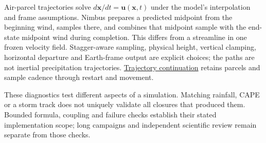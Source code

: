 Air-parcel trajectories solve $d\boldsymbol x/dt=\boldsymbol u(\boldsymbol x,t)$
under the model's interpolation and frame assumptions. Nimbus prepares a
predicted midpoint from the beginning wind, samples there, and combines that
midpoint sample with the end-state midpoint wind during completion. This
differs from a streamline in one frozen velocity field. Stagger-aware sampling,
physical height, vertical clamping, horizontal departure and Earth-frame output
are explicit choices; the paths are not inertial precipitation trajectories.
\href{../src/diagnostics/trajectories/trajectories.cpp}{Trajectory continuation}
retains parcels and sample cadence through restart and movement.

These diagnostics test different aspects of a simulation. Matching rainfall,
CAPE or a storm track does not uniquely validate all closures that produced
them. Bounded formula, coupling and failure checks establish their stated
implementation scope; long campaigns and independent scientific review remain
separate from those checks.
